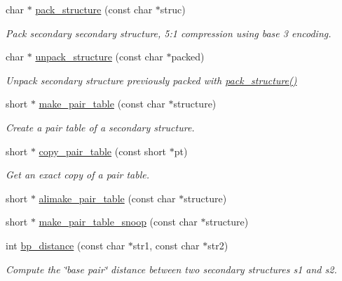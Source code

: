 \begin{DoxyCompactItemize}
char $\ast$ \hyperlink{group__struct__utils__deprecated_gac6dfa5e22928c087c6e09ff0054a7ced}{pack\+\_\+structure} (const char $\ast$struc)
\begin{DoxyCompactList}\small\item\em Pack secondary secondary structure, 5\+:1 compression using base 3 encoding. \end{DoxyCompactList}\item 
char $\ast$ \hyperlink{group__struct__utils__deprecated_ga071c6921efe1eb974f115ee6fefa3c39}{unpack\+\_\+structure} (const char $\ast$packed)
\begin{DoxyCompactList}\small\item\em Unpack secondary structure previously packed with \hyperlink{group__struct__utils__deprecated_gac6dfa5e22928c087c6e09ff0054a7ced}{pack\+\_\+structure()} \end{DoxyCompactList}\item 
short $\ast$ \hyperlink{group__struct__utils__deprecated_ga89c32307ee50a0026f4a3131fac0845a}{make\+\_\+pair\+\_\+table} (const char $\ast$structure)
\begin{DoxyCompactList}\small\item\em Create a pair table of a secondary structure. \end{DoxyCompactList}\item 
short $\ast$ \hyperlink{group__struct__utils__deprecated_gafeaa6d68eef3a99d0a7aa08aa91c6601}{copy\+\_\+pair\+\_\+table} (const short $\ast$pt)
\begin{DoxyCompactList}\small\item\em Get an exact copy of a pair table. \end{DoxyCompactList}\item 
short $\ast$ \hyperlink{group__struct__utils__deprecated_ga3c81b3967056c3888b8472b65fbb16f5}{alimake\+\_\+pair\+\_\+table} (const char $\ast$structure)
\item 
short $\ast$ \hyperlink{group__struct__utils__deprecated_ga9aa3bf3b4346bb7fb88efc154dd07a79}{make\+\_\+pair\+\_\+table\+\_\+snoop} (const char $\ast$structure)
\item 
int \hyperlink{group__struct__utils__deprecated_ga6ebbcd29a754f0e4f1a66d1fd84184db}{bp\+\_\+distance} (const char $\ast$str1, const char $\ast$str2)
\begin{DoxyCompactList}\small\item\em Compute the \char`\"{}base pair\char`\"{} distance between two secondary structures s1 and s2. \end{DoxyCompactList}\item 

\end{DoxyCompactItemize}
